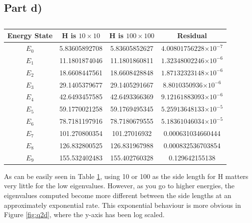 \documentclass[a4paper,12pt]{article}
\providecommand{\e}[1]{\ensuremath{\times 10^{#1}}}
\begin{document}
\subsection{Part d)}

\begin{table}[H]
  \centering
  \begin{tabular}{|c||c||c||c|}
  \hline
  Energy State & H is $10 \times 10$ & H is $100 \times 100$ & Residual\\
  \hline
  \hline
   $E_0$ & 5.83605892708 & 5.83605852627 & $4.00801756228\e{-7}$\\
	\hline
	 $E_1$ & 11.1801874046 & 11.1801860811 & $1.32348002246\e{-6}$\\
	\hline
	 $E_2$ & 18.6608447561 & 18.6608428848 & $1.87132323148\e{-6}$\\
	\hline
	 $E_3$ & 29.1405379677 & 29.1405291667 & $8.8010350936\e{-6}$\\
	\hline
	 $E_4$ & 42.6493457585 & 42.6493366369 & $9.12161883093\e{-6}$\\
	\hline
	 $E_5$ & 59.1770021258 & 59.1769495345 & $5.25913648133\e{-5}$\\
	\hline
	 $E_6$ & 78.7181197916 & 78.7180679555 & $5.18361046034\e{-5}$\\
	\hline
	 $E_7$ & 101.270800354 & 101.27016932 & 0.000631034660444\\
	\hline
	 $E_8$ & 126.832800525 & 126.831967988 & 0.000832536703854\\
	\hline
	 $E_9$ & 155.532402483 & 155.402760328 & 0.129642155138\\
	\hline
  \end{tabular}
  \caption{}
\label{tab:energy}
\end{table}

As can be easily seen in Table \ref{tab:energy}, using 10 or 100 as the side length for H matters very little for the low eigenvalues. However, as you go to higher energies, the eigenvalues computed become more different between the side lengths at an approximately exponential rate. This exponential behaviour is more obvious in Figure \ref{fig:q2d}, where the y-axis has been log scaled.
\end{document}
